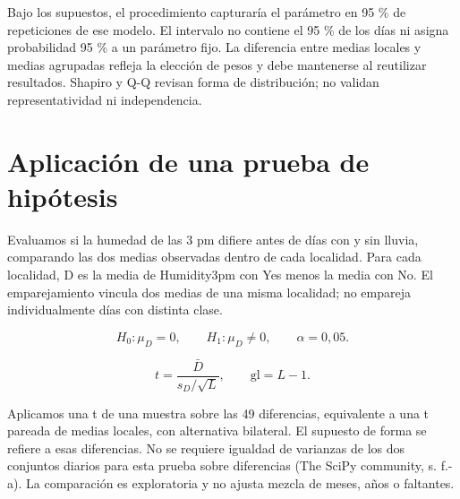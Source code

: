 \documentclass[11pt,a4paper]{article}
\begin{document}
Bajo los supuestos, el procedimiento capturaría el parámetro en 95 \% de repeticiones de ese modelo. El intervalo no contiene el 95 \% de los días ni asigna probabilidad 95 \% a un parámetro fijo. La diferencia entre medias locales y medias agrupadas refleja la elección de pesos y debe mantenerse al reutilizar resultados. Shapiro y Q-Q revisan forma de distribución; no validan representatividad ni independencia.


\clearpage


\section{Aplicación de una prueba de hipótesis}

Evaluamos si la humedad de las 3 pm difiere antes de días con y sin lluvia, comparando las dos medias observadas dentro de cada localidad. Para cada localidad, D es la media de Humidity3pm con Yes menos la media con No. El emparejamiento vincula dos medias de una misma localidad; no empareja individualmente días con distinta clase.


\[H_0:\mu_D=0,\qquad H_1:\mu_D\ne0,\qquad\alpha=0{,}05.\]

\[t=\frac{\bar{D}}{s_D/\sqrt{L}},\qquad\mathrm{gl}=L-1.\]

Aplicamos una t de una muestra sobre las 49 diferencias, equivalente a una t pareada de medias locales, con alternativa bilateral. El supuesto de forma se refiere a esas diferencias. No se requiere igualdad de varianzas de los dos conjuntos diarios para esta prueba sobre diferencias (The SciPy community, s. f.-a). La comparación es exploratoria y no ajusta mezcla de meses, años o faltantes.
\end{document}
